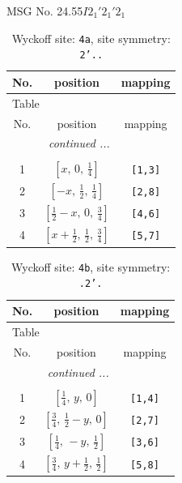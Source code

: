 \documentclass[fleqn,8pt]{jsarticle}
\begin{document}
\setcounter{MaxMatrixCols}{32}

\renewcommand{\tablename}{Table~}
\renewcommand{\figurename}{Figure~}
\begin{center}
\LARGE
MSG No. 24.55\quad$I2_{1}'2_{1}'2_{1}$
\end{center}
\renewcommand{\arraystretch}{1.2}
\begin{longtable}{ccc}
\caption{Wyckoff site: {\tt 4a}, site symmetry: {\tt 2'..}}
 \\
 \hline \hline
No. & position & mapping \\ \hline \endfirsthead

\multicolumn{2}{l}{\tablename\ \thetable{}} \\
 \hline \hline
No. & position & mapping \\ \hline \endhead

 \hline \hline
\multicolumn{2}{r}{\footnotesize\it continued ...} \\ \endfoot

 \hline \hline
\multicolumn{2}{r}{} \\ \endlastfoot

1 & $\left[ x,\, 0,\, \frac{1}{4} \right]$ & {\tt [1,3]} \\ \hline
2 & $\left[ - x,\, \frac{1}{2},\, \frac{1}{4} \right]$ & {\tt [2,8]} \\ \hline
3 & $\left[ \frac{1}{2} - x,\, 0,\, \frac{3}{4} \right]$ & {\tt [4,6]} \\ \hline
4 & $\left[ x + \frac{1}{2},\, \frac{1}{2},\, \frac{3}{4} \right]$ & {\tt [5,7]} \\
\end{longtable}
\renewcommand{\arraystretch}{1.2}
\begin{longtable}{ccc}
\caption{Wyckoff site: {\tt 4b}, site symmetry: {\tt .2'.}}
 \\
 \hline \hline
No. & position & mapping \\ \hline \endfirsthead

\multicolumn{2}{l}{\tablename\ \thetable{}} \\
 \hline \hline
No. & position & mapping \\ \hline \endhead

 \hline \hline
\multicolumn{2}{r}{\footnotesize\it continued ...} \\ \endfoot

 \hline \hline
\multicolumn{2}{r}{} \\ \endlastfoot

1 & $\left[ \frac{1}{4},\, y,\, 0 \right]$ & {\tt [1,4]} \\ \hline
2 & $\left[ \frac{3}{4},\, \frac{1}{2} - y,\, 0 \right]$ & {\tt [2,7]} \\ \hline
3 & $\left[ \frac{1}{4},\, - y,\, \frac{1}{2} \right]$ & {\tt [3,6]} \\ \hline
4 & $\left[ \frac{3}{4},\, y + \frac{1}{2},\, \frac{1}{2} \right]$ & {\tt [5,8]} \\
\end{longtable}
\end{document}
